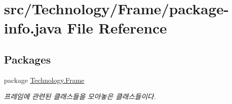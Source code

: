 \hypertarget{_technology_2_frame_2package-info_8java}{\section{src/\-Technology/\-Frame/package-\/info.java File Reference}
\label{_technology_2_frame_2package-info_8java}
}
\subsection*{Packages}
\begin{DoxyCompactItemize}
\item 
package \hyperlink{namespace_technology_1_1_frame}{Technology.\-Frame}
\begin{DoxyCompactList}\small\item\em 프레임에 관련된 클래스들을 모아놓은 클래스들이다. \end{DoxyCompactList}\end{DoxyCompactItemize}
